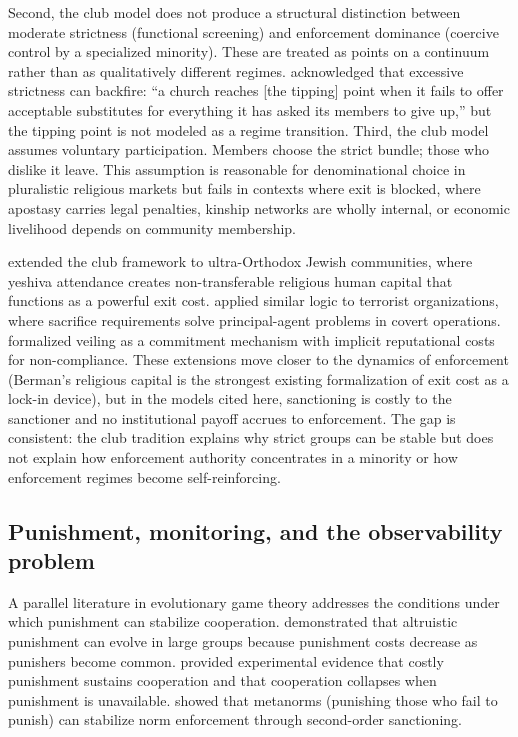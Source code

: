\documentclass[12pt]{article}
\begin{document}
Second, the club model does not produce a structural distinction between moderate strictness (functional screening) and enforcement dominance (coercive control by a specialized minority). These are treated as points on a continuum rather than as qualitatively different regimes. \citet{iannaccone1994} acknowledged that excessive strictness can backfire: ``a church reaches [the tipping] point when it fails to offer acceptable substitutes for everything it has asked its members to give up,'' but the tipping point is not modeled as a regime transition. Third, the club model assumes voluntary participation. Members choose the strict bundle; those who dislike it leave. This assumption is reasonable for denominational choice in pluralistic religious markets but fails in contexts where exit is blocked, where apostasy carries legal penalties, kinship networks are wholly internal, or economic livelihood depends on community membership.

\citet{berman2000} extended the club framework to ultra-Orthodox Jewish communities, where yeshiva attendance creates non-transferable religious human capital that functions as a powerful exit cost. \citet{berman2008} applied similar logic to terrorist organizations, where sacrifice requirements solve principal-agent problems in covert operations. \citet{carvalho2013} formalized veiling as a commitment mechanism with implicit reputational costs for non-compliance. These extensions move closer to the dynamics of enforcement (Berman's religious capital is the strongest existing formalization of exit cost as a lock-in device), but in the models cited here, sanctioning is costly to the sanctioner and no institutional payoff accrues to enforcement. The gap is consistent: the club tradition explains why strict groups can be stable but does not explain how enforcement authority concentrates in a minority or how enforcement regimes become self-reinforcing.

\subsection{Punishment, monitoring, and the observability problem}

A parallel literature in evolutionary game theory addresses the conditions under which punishment can stabilize cooperation. \citet{boyd2003} demonstrated that altruistic punishment can evolve in large groups because punishment costs decrease as punishers become common. \citet{fehr2000,fehr2002} provided experimental evidence that costly punishment sustains cooperation and that cooperation collapses when punishment is unavailable. \citet{axelrod1986} showed that metanorms (punishing those who fail to punish) can stabilize norm enforcement through second-order sanctioning.
\end{document}
